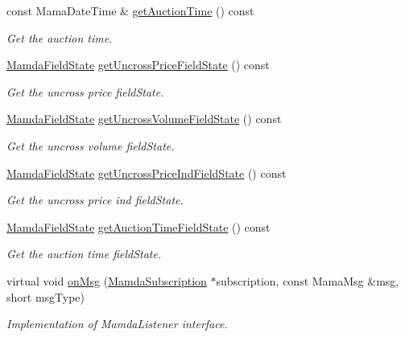 \begin{CompactItemize}
const Mama\-Date\-Time \& \hyperlink{classWombat_1_1MamdaAuctionListener_65c25c4e3840fd5a70fff6495cccc0c4}{get\-Auction\-Time} () const 
\begin{CompactList}\small\item\em Get the auction time. \item\end{CompactList}\item 
\hyperlink{namespaceWombat_93aac974f2ab713554fd12a1fa3b7d2a}{Mamda\-Field\-State} \hyperlink{classWombat_1_1MamdaAuctionListener_be7081fdcfdb4f70ad917fe12b6ad2ce}{get\-Uncross\-Price\-Field\-State} () const 
\begin{CompactList}\small\item\em Get the uncross price field\-State. \item\end{CompactList}\item 
\hyperlink{namespaceWombat_93aac974f2ab713554fd12a1fa3b7d2a}{Mamda\-Field\-State} \hyperlink{classWombat_1_1MamdaAuctionListener_8c84b078ac2c5e02cbb1dea5810cca7a}{get\-Uncross\-Volume\-Field\-State} () const 
\begin{CompactList}\small\item\em Get the uncross volume field\-State. \item\end{CompactList}\item 
\hyperlink{namespaceWombat_93aac974f2ab713554fd12a1fa3b7d2a}{Mamda\-Field\-State} \hyperlink{classWombat_1_1MamdaAuctionListener_99612e2b16ee7630f35ec21060109b11}{get\-Uncross\-Price\-Ind\-Field\-State} () const 
\begin{CompactList}\small\item\em Get the uncross price ind field\-State. \item\end{CompactList}\item 
\hyperlink{namespaceWombat_93aac974f2ab713554fd12a1fa3b7d2a}{Mamda\-Field\-State} \hyperlink{classWombat_1_1MamdaAuctionListener_62f24f47ce07200543881e47e8ff100f}{get\-Auction\-Time\-Field\-State} () const 
\begin{CompactList}\small\item\em Get the auction time field\-State. \item\end{CompactList}\item 
virtual void \hyperlink{classWombat_1_1MamdaAuctionListener_55aa468360f3612650a7d4dbc694cf9f}{on\-Msg} (\hyperlink{classWombat_1_1MamdaSubscription}{Mamda\-Subscription} $\ast$subscription, const Mama\-Msg \&msg, short msg\-Type)
\begin{CompactList}\small\item\em Implementation of Mamda\-Listener interface. \item\end{CompactList}\end{CompactItemize}


